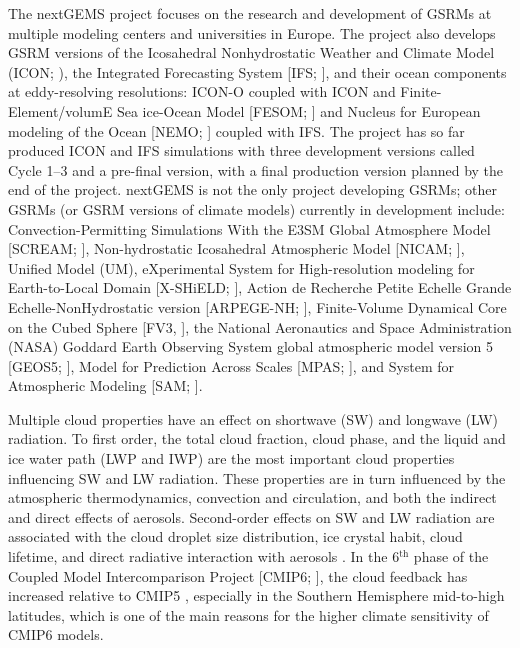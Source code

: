 \documentclass[draft]{agujournal2019}
\begin{document}
The nextGEMS project focuses on the research and development of GSRMs at multiple modeling centers and universities in Europe. The project also develops GSRM versions of the Icosahedral Nonhydrostatic Weather and Climate Model (ICON; ), the Integrated Forecasting System [IFS; ], and their ocean components at eddy-resolving resolutions: ICON-O \cite{korn2022} coupled with ICON and Finite-Element/volumE Sea ice-Ocean Model [FESOM; ] and Nucleus for European modeling of the Ocean [NEMO; ] coupled with IFS. The project has so far produced ICON and IFS simulations with three development versions called Cycle 1–3 and a pre-final version, with a final production version planned by the end of the project. nextGEMS is not the only project developing GSRMs; other GSRMs (or GSRM versions of climate models) currently in development include: Convection-Permitting Simulations With the E3SM Global Atmosphere Model [SCREAM; ], Non-hydrostatic Icosahedral Atmospheric Model [NICAM; ], Unified Model (UM), eXperimental System for High-resolution modeling for Earth-to-Local Domain [X-SHiELD; ], Action de Recherche Petite Echelle Grande Echelle-NonHydrostatic version [ARPEGE-NH; ], Finite-Volume Dynamical Core on the Cubed Sphere [FV3, ], the National Aeronautics and Space Administration (NASA) Goddard Earth Observing System global atmospheric model version 5 [GEOS5; ], Model for Prediction Across Scales [MPAS; ], and System for Atmospheric Modeling [SAM; ].

Multiple cloud properties have an effect on shortwave (SW) and longwave (LW) radiation. To first order, the total cloud fraction, cloud phase, and the liquid and ice water path (LWP and IWP) are the most important cloud properties influencing SW and LW radiation. These properties are in turn influenced by the atmospheric thermodynamics, convection and circulation, and both the indirect and direct effects of aerosols. Second-order effects on SW and LW radiation are associated with the cloud droplet size distribution, ice crystal habit, cloud lifetime, and direct radiative interaction with aerosols \cite{boucher2013}. In the 6$^\mathrm{th}$ phase of the Coupled Model Intercomparison Project [CMIP6; ], the cloud feedback has increased relative to CMIP5 \cite{zelinka2020}, especially in the Southern Hemisphere mid-to-high latitudes, which is one of the main reasons for the higher climate sensitivity of CMIP6 models.
\end{document}
